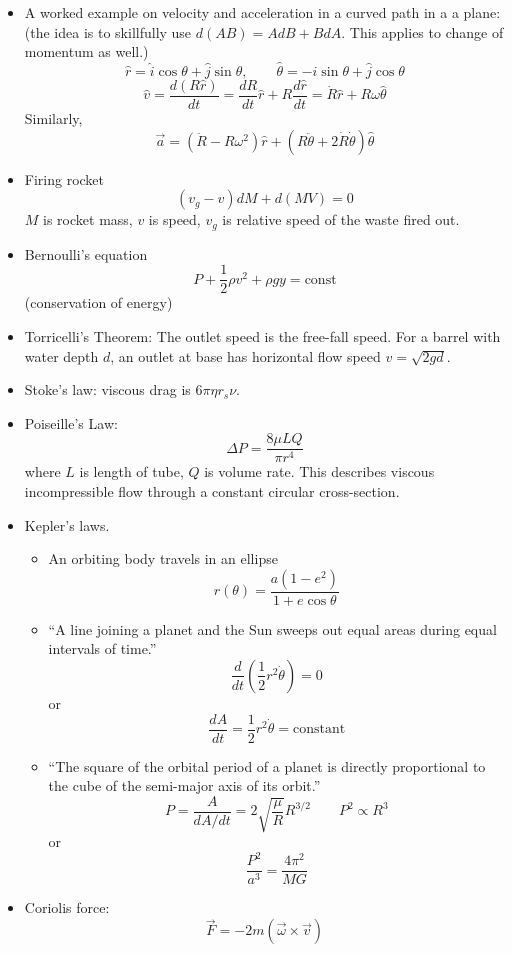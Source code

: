 \documentclass[12pt,a4paper]{book}
\begin{document}
\begin{itemize}
\item A worked example on velocity and acceleration in a curved path in
a a plane: (the idea is to skillfully use $d(AB)=AdB+BdA$. This applies
to change of momentum as well.)\[
\hat{r}=\hat{i}\cos\theta+\hat{j}\sin\theta,\qquad\hat{\theta}=-\hat{i}\sin\theta+\hat{j}\cos\theta\]
\[
\hat{v}=\frac{d(R\hat{r})}{dt}=\frac{dR}{dt}\hat{r}+R\frac{d\hat{r}}{dt}=\dot{R}\hat{r}+R\omega\hat{\theta}\]
Similarly, \[
\vec{a}=(\ddot{R}-R\omega^{2})\hat{r}+(R\ddot{\theta}+2\dot{R}\dot{\theta})\hat{\theta}\]

\item Firing rocket\[
(v_{g}-v)dM+d(MV)=0\]
$M$ is rocket mass, $v$ is speed, $v_{g}$ is relative speed of
the waste fired out.
\item Bernoulli's equation\[
P+\frac{1}{2}\rho v^{2}+\rho gy=\text{const}\]
(conservation of energy)
\item Torricelli's Theorem: The outlet speed is the free-fall speed. For
a barrel with water depth $d$, an outlet at base has horizontal flow
speed $v=\sqrt{2gd}$.
\item Stoke's law: viscous drag is $6\pi\eta r_{s}\nu$.
\item Poiseille's Law:\[
\Delta P=\frac{8\mu LQ}{\pi r^{4}}\]
where $L$ is length of tube, $Q$ is volume rate. This describes
viscous incompressible flow through a constant circular cross-section.
\item Kepler's laws.

\begin{itemize}
\item An orbiting body travels in an ellipse\[
r(\theta)=\frac{a(1-e^{2})}{1+e\cos\theta}\]

\item {}``A line joining a planet and the Sun sweeps out equal areas during
equal intervals of time.''\[
\frac{d}{dt}\left(\frac{1}{2}r^{2}\dot{\theta}\right)=0\]
or\[
\frac{dA}{dt}=\frac{1}{2}r^{2}\dot{\theta}=\text{constant}\]

\item {}``The square of the orbital period of a planet is directly proportional
to the cube of the semi-major axis of its orbit.''\[
P=\frac{A}{dA/dt}=2\sqrt{\frac{\mu}{R}}R^{3/2}\qquad P^{2}\propto R^{3}\]
or \[
\frac{P^{2}}{a^{3}}=\frac{4\pi^{2}}{MG}\]

\end{itemize}
\item Coriolis force:\[
\vec{F}=-2m(\vec{\omega}\times\vec{v})\]


\end{itemize}
\end{document}
